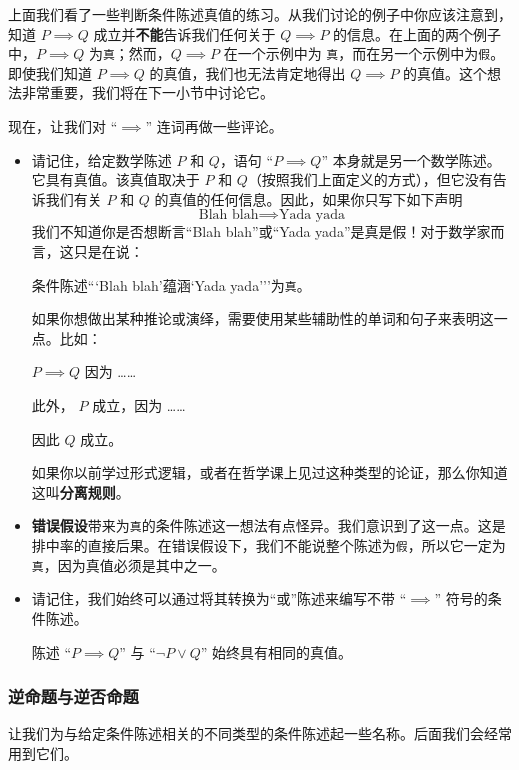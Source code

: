 上面我们看了一些判断条件陈述真值的练习。从我们讨论的例子中你应该注意到，知道 $P \implies Q$ 成立并\textbf{不能}告诉我们任何关于 $Q \implies P$ 的信息。在上面的两个例子中，$P\implies Q$ 为\verb|真|；然而，$Q \implies P$ 在一个示例中为 \verb|真|，而在另一个示例中为\verb|假|。即使我们知道 $P \implies Q$ 的真值，我们也无法肯定地得出 $Q \implies P$ 的真值。这个想法非常重要，我们将在下一小节中讨论它。

现在，让我们对 ``$\implies$'' 连词再做一些评论。

\begin{itemize}
    \item 请记住，给定数学陈述 $P$ 和 $Q$，语句 ``$P \implies Q$'' 本身就是另一个数学陈述。它具有真值。该真值取决于 $P$ 和 $Q$（按照我们上面定义的方式），但它没有告诉我们有关 $P$ 和 $Q$ 的真值的任何信息。因此，如果你只写下如下声明
    \[\text{Blah blah} \implies \text{Yada yada}\]
    我们不知道你是否想断言``Blah blah''或``Yada yada''是真是假！对于数学家而言，这只是在说：
    \begin{center}
        条件陈述```Blah blah'蕴涵`Yada yada'''为\verb|真|。
    \end{center}
    如果你想做出某种推论或演绎，需要使用某些辅助性的单词和句子来表明这一点。比如：
    \begin{center}
        $P \implies Q$ 因为 ……

        此外， $P$ 成立，因为 ……

        因此 $Q$ 成立。
    \end{center}
    如果你以前学过形式逻辑，或者在哲学课上见过这种类型的论证，那么你知道这叫\textbf{分离规则}。\label{sec:section4.5.6}
    \item \textbf{错误假设}带来为\verb|真|的条件陈述这一想法有点怪异。我们意识到了这一点。这是排中率的直接后果。在错误假设下，我们不能说整个陈述为\verb|假|，所以它一定为\verb|真|，因为真值必须是其中之一。
    \item 请记住，我们始终可以通过将其转换为``或''陈述来编写不带 ``$\implies$'' 符号的条件陈述。
        \begin{center}
            陈述 ``$P \implies Q$'' 与 ``$\neg P \lor Q$'' 始终具有相同的真值。
        \end{center}
\end{itemize}

\subsubsection*{逆命题与逆否命题}

让我们为与给定条件陈述相关的不同类型的条件陈述起一些名称。后面我们会经常用到它们。

